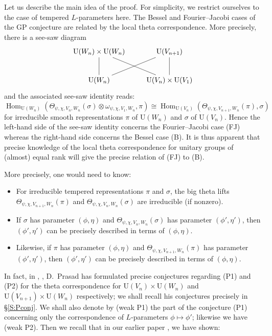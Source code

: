 \documentclass[11pt]{amsart}
\numberwithin{equation}{section}
\theoremstyle{plain}
\theoremstyle{definition}
\theoremstyle{remark}
\def\Hom{\operatorname{Hom}}
\def\U{\mathrm{U}}
\begin{document}
Let us describe the main idea of the proof.
For simplicity, we restrict ourselves to the case of tempered $L$-parameters here.
The Bessel and Fourier--Jacobi cases of the GP conjecture are related by the local theta correspondence. More precisely, there is a see-saw diagram
\[
 \xymatrix{
  \U(W_n)  \times \U(W_n)  \ar@{-}[dr] \ar@{-}[d] & \U(V_{n+1}) 
     \ar@{-}[d] \\
  \U(W_n) \ar@{-}[ur] &  \U(V_n) \times \U(V_1)}
\]  
and the associated see-saw identity reads:
\[  \Hom_{\U(W_n)}( \Theta_{\psi, \chi, V_n, W_n}(\sigma) \otimes \omega_{\psi, \chi, V_1, W_n},  \pi) \cong \Hom_{\U(V_n)}(\Theta_{\psi, \chi, V_{n+1}, W_n}(\pi),  \sigma) \]
for irreducible smooth representations $\pi$ of $\U(W_n)$ and $\sigma$ of $\U(V_n)$. Hence the left-hand side of the see-saw identity concerns the Fourier--Jacobi case (FJ) whereas the right-hand side concerns the Bessel case (B). It is thus apparent that precise knowledge of the local theta correspondence for unitary groups of (almost) equal rank will give the precise relation of (FJ) to (B).  

More precisely, one would need to know:
\begin{itemize}
\item[($\Theta$)] 
For irreducible tempered representations $\pi$ and $\sigma$, the big theta lifts $\Theta_{\psi, \chi, V_{n+1}, W_n}(\pi)$ and $\Theta_{\psi, \chi, V_n, W_n}(\sigma)$ are irreducible (if nonzero).

\item[(P1)] If $\sigma$ has parameter $(\phi, \eta)$ and $\Theta_{\psi, \chi, V_n, W_n}(\sigma)$ has parameter $(\phi', \eta')$, then $(\phi',\eta')$ can be precisely described in terms of $(\phi,\eta)$.

\item[(P2)]  Likewise, if $\pi$ has parameter $(\phi, \eta)$ and $\Theta_{\psi, \chi, V_{n+1}, W_n}(\pi)$ has parameter $(\phi', \eta')$, then $(\phi',\eta')$ can be precisely described in terms of $(\phi,\eta)$.
\end{itemize}

In fact, in \cite{p1}, \cite{p2}, D.~Prasad has formulated precise conjectures regarding (P1) and (P2) for the theta correspondence for $\U(V_n) \times \U(W_n)$ and $\U(V_{n+1}) \times \U(W_n)$ respectively; we shall recall his conjectures precisely in \S \ref{S:Pconj}.  We shall also denote by (weak P1) the part of the conjecture (P1) concerning only the correspondence of $L$-parameters $\phi \mapsto \phi'$; likewise we have (weak P2). Then we recall that in our earlier paper \cite{gi}, we have shown:
\end{document}
